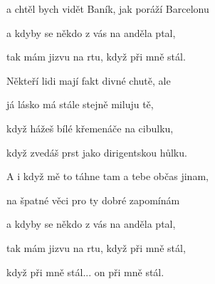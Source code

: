 a chtěl bych vidět Baník, jak poráží Barcelonu

a kdyby se někdo z vás na anděla ptal,

tak mám jizvu na rtu, když při mně stál.
\ks

\zs
Někteří lidi mají fakt divné chutě, ale

já lásko má stále stejně miluju tě,

když hážeš bílé křemenáče na cibulku,

když zvedáš prst jako dirigentskou hůlku.

A i když mě to táhne tam a tebe občas jinam,

na špatné věci pro ty dobré zapomínám

a kdyby se někdo z vás na anděla ptal,

tak mám jizvu na rtu, když při mně stál,

když při mně stál... on při mně stál.
\ks

\kp
